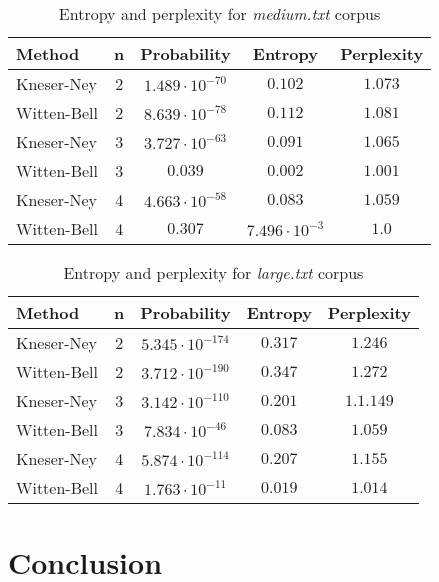 \documentclass[10pt, a4paper]{article}
\begin{document}
\begin{table}[h]
\caption{Entropy and perplexity for \textit{medium.txt} corpus}
\label{tab:medium}
\begin{center}
\begin{tabular}{lcccc}
\toprule
Method & n & Probability & Entropy & Perplexity \\
\midrule
Kneser-Ney & 2 & $1.489 \cdot 10^{-70}$ & $0.102$ & $1.073$ \\
Witten-Bell & 2 & $8.639 \cdot 10^{-78}$ & $0.112$ & $1.081$ \\

Kneser-Ney & 3 & $3.727 \cdot 10^{-63}$ & $0.091$ & $1.065$ \\
Witten-Bell & 3 & $0.039$ & $0.002$ & $1.001$ \\

Kneser-Ney & 4 & $4.663 \cdot 10^{-58}$ & $0.083$ & $1.059$ \\
Witten-Bell & 4 & $0.307$ & $7.496 \cdot 10^{-3}$ & $1.0$ \\
\bottomrule
\end{tabular}
\end{center}
\end{table}


\begin{table}[h]
\caption{Entropy and perplexity for \textit{large.txt} corpus}
\label{tab:large}
\begin{center}
\begin{tabular}{lcccc}
\toprule
Method & n & Probability & Entropy & Perplexity \\
\midrule
Kneser-Ney & 2 & $5.345 \cdot 10^{-174}$ & $0.317$ & $1.246$ \\
Witten-Bell & 2 & $3.712 \cdot 10^{-190}$ & $0.347$ & $1.272$ \\

Kneser-Ney & 3 & $3.142 \cdot 10^{-110}$ & $0.201$ & $1.1.149$ \\
Witten-Bell & 3 & $7.834 \cdot 10^{-46}$ & $0.083$ & $1.059$ \\

Kneser-Ney & 4 & $5.874 \cdot 10^{-114}$ & $0.207$ & $1.155$ \\
Witten-Bell & 4 & $1.763 \cdot 10^{-11}$ & $0.019$ & $1.014$ \\
\bottomrule
\end{tabular}
\end{center}
\end{table}



\section{Conclusion}
\end{document}
